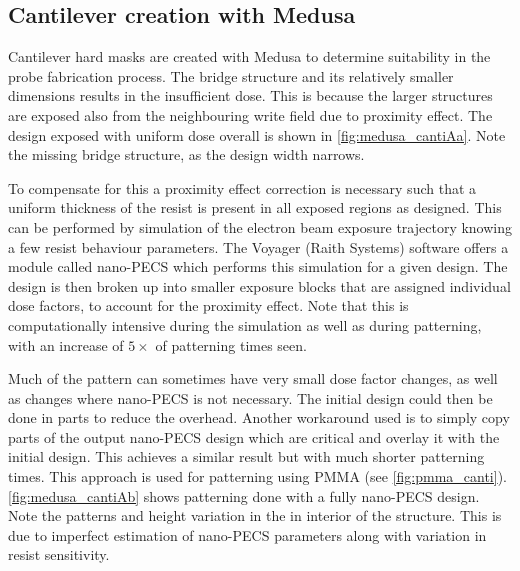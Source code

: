 \subsection{Cantilever creation with Medusa}
Cantilever hard masks are created with Medusa to determine suitability in the probe fabrication process. The bridge structure and its relatively smaller dimensions results in the insufficient dose. This is because the larger structures are exposed also from the neighbouring write field due to proximity effect. The design exposed with uniform dose overall is shown in \cref{fig:medusa_cantiAa}. Note the missing bridge structure, as the design width narrows. 

To compensate for this a proximity effect correction is necessary such that a uniform thickness of the resist is present in all exposed regions as designed. This can be performed by simulation of the electron beam exposure trajectory knowing a few resist behaviour parameters\cite{opaluchMedusa84SiH2025}. The Voyager (Raith Systems) software offers a module called nano-\gls{PECS} which performs this simulation for a given design. The design is then broken up into smaller exposure blocks that are assigned individual dose factors, to account for the proximity effect. Note that this is computationally intensive during the simulation as well as during patterning, with an increase of $5\times$ of patterning times seen. 

Much of the pattern can sometimes have very small dose factor changes, as well as changes where nano-\gls{PECS} is not necessary. The initial design could then be done in parts to reduce the overhead. Another workaround used is to simply copy parts of the output nano-\gls{PECS} design which are critical and overlay it with the initial design. This achieves a similar result but with much shorter patterning times. This approach is used for patterning using \gls{PMMA} (see \cref{fig:pmma_canti}). \cref{fig:medusa_cantiAb} shows patterning done with a fully nano-\gls{PECS} design. Note the patterns and height variation in the in interior of the structure. This is due to imperfect estimation of nano-\gls{PECS} parameters along with variation in resist sensitivity. 


